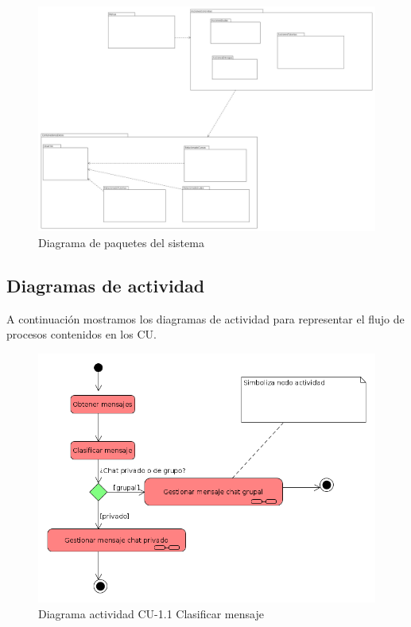     
    \begin{figure}[!ht] %
\centering
\includegraphics[scale=0.2]{imagenes/diagramas/diagrama_de_paquetes.png}  %

\caption{Diagrama de paquetes del sistema}\label{figura20}
\end{figure}

    
    
    \newpage
    
   \subsection{Diagramas de actividad}

A continuación mostramos los diagramas de actividad para representar el flujo de procesos contenidos en los CU.

    \begin{figure}[!ht] %
\centering
\includegraphics[scale=0.5]{imagenes/diagramas/actividad/clasificar_mensaje.png}  %

\caption{Diagrama actividad CU-1.1 Clasificar mensaje}\label{figura111}
\end{figure}

